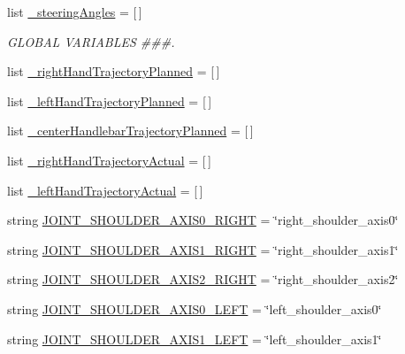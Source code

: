 \begin{DoxyCompactItemize}
\item 
list \mbox{\hyperlink{namespacesteering__trajectory__test_a7ff6efb26259954a3c22719158d5a8d2}{\+\_\+steering\+Angles}} = \mbox{[}$\,$\mbox{]}
\begin{DoxyCompactList}\small\item\em G\+L\+O\+B\+AL V\+A\+R\+I\+A\+B\+L\+ES \#\#\#. \end{DoxyCompactList}\item 
list \mbox{\hyperlink{namespacesteering__trajectory__test_a5b0c1e7de78bda1444cdc6bfe62df695}{\+\_\+right\+Hand\+Trajectory\+Planned}} = \mbox{[}$\,$\mbox{]}
\item 
list \mbox{\hyperlink{namespacesteering__trajectory__test_a5044d4656d9486bd4b92af8ab8d10757}{\+\_\+left\+Hand\+Trajectory\+Planned}} = \mbox{[}$\,$\mbox{]}
\item 
list \mbox{\hyperlink{namespacesteering__trajectory__test_a7d2ff7d6f92c82fde933946482475d35}{\+\_\+center\+Handlebar\+Trajectory\+Planned}} = \mbox{[}$\,$\mbox{]}
\item 
list \mbox{\hyperlink{namespacesteering__trajectory__test_ac3612e922a7c68b289b887c971e2ebd1}{\+\_\+right\+Hand\+Trajectory\+Actual}} = \mbox{[}$\,$\mbox{]}
\item 
list \mbox{\hyperlink{namespacesteering__trajectory__test_a6ecfabbaa895fd9054610dd229a0f435}{\+\_\+left\+Hand\+Trajectory\+Actual}} = \mbox{[}$\,$\mbox{]}
\item 
string \mbox{\hyperlink{namespacesteering__trajectory__test_ad63535534760c5560867d572985fe280}{J\+O\+I\+N\+T\+\_\+\+S\+H\+O\+U\+L\+D\+E\+R\+\_\+\+A\+X\+I\+S0\+\_\+\+R\+I\+G\+HT}} = \char`\"{}right\+\_\+shoulder\+\_\+axis0\char`\"{}
\item 
string \mbox{\hyperlink{namespacesteering__trajectory__test_a52d86b34e76d3e673fadee11dd28eb93}{J\+O\+I\+N\+T\+\_\+\+S\+H\+O\+U\+L\+D\+E\+R\+\_\+\+A\+X\+I\+S1\+\_\+\+R\+I\+G\+HT}} = \char`\"{}right\+\_\+shoulder\+\_\+axis1\char`\"{}
\item 
string \mbox{\hyperlink{namespacesteering__trajectory__test_a6faffd4b15d38616399204d833144b1f}{J\+O\+I\+N\+T\+\_\+\+S\+H\+O\+U\+L\+D\+E\+R\+\_\+\+A\+X\+I\+S2\+\_\+\+R\+I\+G\+HT}} = \char`\"{}right\+\_\+shoulder\+\_\+axis2\char`\"{}
\item 
string \mbox{\hyperlink{namespacesteering__trajectory__test_af189b69e3081121d8719343bf54cd679}{J\+O\+I\+N\+T\+\_\+\+S\+H\+O\+U\+L\+D\+E\+R\+\_\+\+A\+X\+I\+S0\+\_\+\+L\+E\+FT}} = \char`\"{}left\+\_\+shoulder\+\_\+axis0\char`\"{}
\item 
string \mbox{\hyperlink{namespacesteering__trajectory__test_a705a717a63fe50e91e7e0e99ebd3b287}{J\+O\+I\+N\+T\+\_\+\+S\+H\+O\+U\+L\+D\+E\+R\+\_\+\+A\+X\+I\+S1\+\_\+\+L\+E\+FT}} = \char`\"{}left\+\_\+shoulder\+\_\+axis1\char`\"{}

\end{DoxyCompactItemize}
